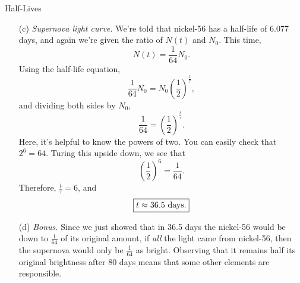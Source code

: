 \documentclass[12pt]{article}
\begin{document}
\begin{probdesc}{7}{Half-Lives}
\begin{enumerate}
\item[(c)] {\em Supernova light curve.}  We're told that nickel-56 has
  a half-life of 6.077 days, and again we're given the ratio of $N(t)$
  and $N_0$.  This time,
\begin{equation}
N(t) = \frac{1}{64} N_0.
\end{equation}
Using the half-life equation,
\begin{equation}
\frac{1}{64} N_0 = N_0 \left(\frac{1}{2}\right)^{\frac{t}{\tau}},
\end{equation}
and dividing both sides by $N_0$,
\begin{equation}
\frac{1}{64} = \left(\frac{1}{2}\right)^{\frac{t}{\tau}}.
\end{equation}
Here, it's helpful to know the powers of two.  You can easily check
that $2^6 = 64$.  Turing this upside down, we see that
\begin{equation}
\left(\frac{1}{2}\right)^6 = \frac{1}{64}.
\end{equation}
Therefore, $\frac{t}{\tau} = 6$, and
\begin{equation}
\boxed{t \approx 36.5 \rm\ days.}
\end{equation}

\item[(d)] {\em Bonus.}  Since we just showed that in 36.5 days the
  nickel-56 would be down to $\frac{1}{64}$ of its original amount, if
  {\em all} the light came from nickel-56, then the supernova would
  only be $\frac{1}{64}$ as bright.  Observing that it remains half
  its original brightness after 80 days means that some other elements
  are responsible.
\end{enumerate}
\end{probdesc}
\end{document}
